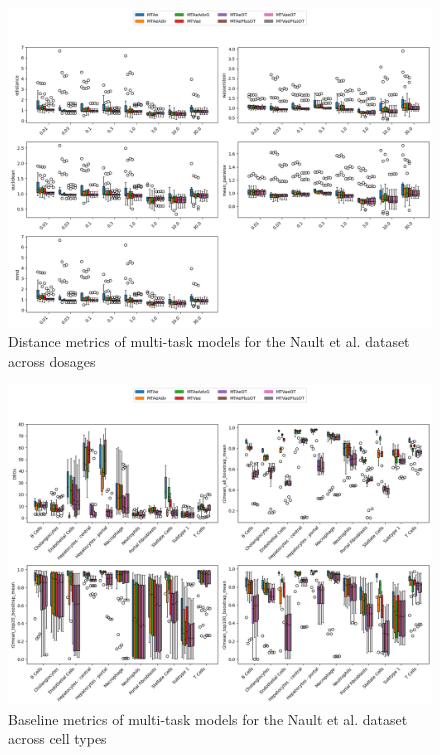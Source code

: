 \documentclass[12pt, a4paper]{article}
\begin{document}
\begin{figure}[h!]
    \centering
    \includegraphics[width=.85\textwidth]{multi_task_benchmarking_doses_distance_metrics_nault.png}
    \caption{Distance metrics of multi-task models for the Nault et al. \cite{nault2021single,nault2022benchmarking} dataset across dosages}
\end{figure}


\begin{figure}[h!]
    \centering
    \includegraphics[width=.85\textwidth]{multi_task_benchmarking_cell_type_baseline_metrics_nault.png}
    \caption{Baseline metrics of multi-task models for the Nault et al. \cite{nault2021single,nault2022benchmarking} dataset across cell types}
\end{figure}
\end{document}
